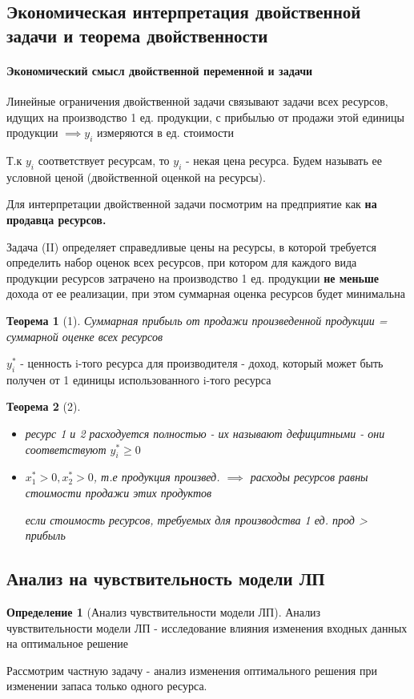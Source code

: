 \documentclass[a4paper]{article}
\newtheorem{theorem}{Теорема}[section]
\theoremstyle{definition}
\newtheorem*{definition}{Определение}
\theoremstyle{remark}
\begin{document}
\subsection{Экономическая интерпретация двойственной задачи и теорема двойственности}

\paragraph*{Экономический смысл двойственной переменной и задачи}
Линейные ограничения двойственной задачи связывают задачи всех ресурсов,
идущих на производство 1 ед. продукции, с прибылью от продажи этой единицы продукции $\implies y_i$ измеряются в ед. стоимости

Т.к $y_i$ соответствует ресурсам, то $y_i$ - некая цена ресурса. Будем называть ее условной ценой (двойственной оценкой на ресурсы).

Для интерпретации двойственной задачи посмотрим на предприятие как \textbf{на продавца ресурсов.}

Задача (II) определяет справедливые цены на ресурсы, в которой требуется определить набор оценок всех ресурсов, при котором для каждого вида продукции ресурсов затрачено на производство 1 ед. продукции \textbf{не меньше} дохода от ее реализации, при этом суммарная оценка ресурсов будет минимальна

\begin{theorem}[1]
    Суммарная прибыль от продажи произведенной продукции =  суммарной оценке всех ресурсов
\end{theorem}
$y_i^*$ - ценность i-того ресурса для производителя - доход, который может быть получен от 1 единицы использованного i-того ресурса
\begin{theorem}[2]
    \begin{itemize}
        \item ресурс 1 и 2 расходуется полностью - их называют дефицитными - они соответствуют $y_i^*\ge 0$

        \item $x_1^* > 0, x_2^* > 0$, т.е продукция произвед. $\implies$ расходы ресурсов равны стоимости продажи этих продуктов

        если стоимость ресурсов, требуемых для производства 1 ед. прод > прибыль
    \end{itemize}
\end{theorem}
\subsection{Анализ на чувствительность модели ЛП}
\begin{definition}[Анализ чувствительности модели ЛП]
    Анализ чувствительности модели ЛП - исследование влияния изменения входных данных на оптимальное решение
\end{definition}
Рассмотрим частную задачу - анализ изменения оптимального решения при изменении запаса только одного ресурса.
\end{document}
